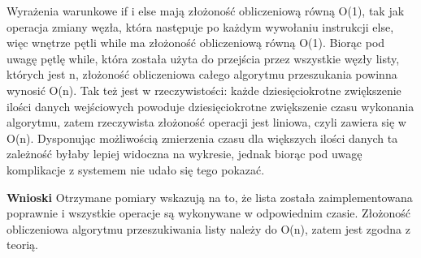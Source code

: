 \documentclass[10pt, a4paper]{article}
\begin{document}
\begin{flushleft}
Wyrażenia warunkowe if i else mają złożoność obliczeniową równą O(1), tak jak operacja zmiany węzła, która następuje po każdym wywołaniu instrukcji else, więc wnętrze pętli while ma złożoność obliczeniową równą O(1). Biorąc pod uwagę pętlę while, która została użyta do przejścia przez wszystkie węzły listy, których jest n, złożoność obliczeniowa całego algorytmu przeszukania powinna wynosić O(n). Tak też jest w rzeczywistości: każde dziesięciokrotne zwiększenie ilości danych wejściowych powoduje dziesięciokrotne zwiększenie czasu wykonania algorytmu, zatem rzeczywista złożoność operacji jest liniowa, czyli zawiera się w O(n). Dysponując możliwością zmierzenia czasu dla większych ilości danych ta zależność byłaby lepiej widoczna na wykresie, jednak biorąc pod uwagę komplikacje z systemem nie udało się tego pokazać.  \newline

\textbf{Wnioski} \newline \newline
Otrzymane pomiary wskazują na to, że lista została zaimplementowana poprawnie i wszystkie operacje są wykonywane w odpowiednim czasie. Złożoność obliczeniowa algorytmu przeszukiwania listy należy do O(n), zatem jest zgodna z teorią.

\end{flushleft}
\end{document}
